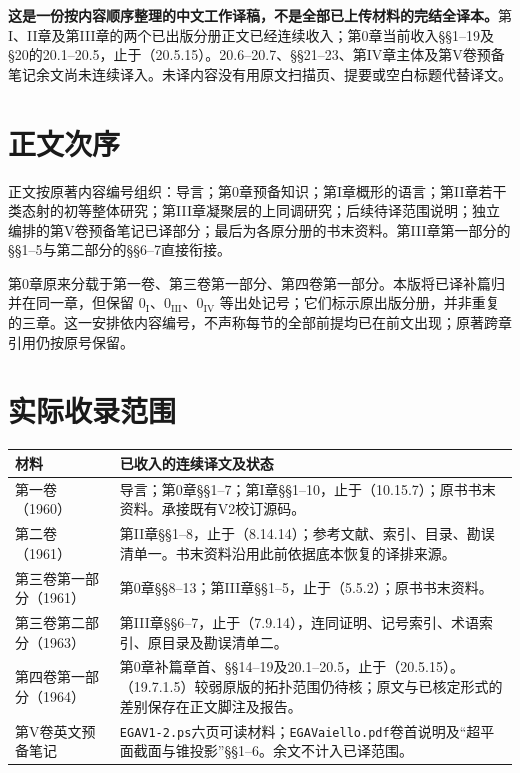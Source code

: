 \maketitle
{}
\noindent\textbf{这是一份按内容顺序整理的中文工作译稿，不是全部已上传材料的完结全译本。}第I、II章及第III章的两个已出版分册正文已经连续收入；第0章当前收入§§1--19及§20的20.1--20.5，止于（20.5.15）。20.6--20.7、§§21--23、第IV章主体及第V卷预备笔记余文尚未连续译入。未译内容没有用原文扫描页、提要或空白标题代替译文。

\section*{正文次序}
正文按原著内容编号组织：导言；第0章预备知识；第I章概形的语言；第II章若干类态射的初等整体研究；第III章凝聚层的上同调研究；后续待译范围说明；独立编排的第V卷预备笔记已译部分；最后为各原分册的书末资料。第III章第一部分的§§1--5与第二部分的§§6--7直接衔接。

第0章原来分载于第一卷、第三卷第一部分、第四卷第一部分。本版将已译补篇归并在同一章，但保留 $0_{\mathrm I}$、$0_{\mathrm{III}}$、$0_{\mathrm{IV}}$ 等出处记号；它们标示原出版分册，并非重复的三章。这一安排依内容编号，不声称每节的全部前提均已在前文出现；原著跨章引用仍按原号保留。

\section*{实际收录范围}
\begin{longtable}{@{}p{.25\linewidth}p{.67\linewidth}@{}}
\toprule 材料 & 已收入的连续译文及状态\\\midrule\endhead
第一卷（1960） & 导言；第0章§§1--7；第I章§§1--10，止于（10.15.7）；原书书末资料。承接既有V2校订源码。\\
第二卷（1961） & 第II章§§1--8，止于（8.14.14）；参考文献、索引、目录、勘误清单一。书末资料沿用此前依据底本恢复的译排来源。\\
第三卷第一部分（1961） & 第0章§§8--13；第III章§§1--5，止于（5.5.2）；原书书末资料。\\
第三卷第二部分（1963） & 第III章§§6--7，止于（7.9.14），连同证明、记号索引、术语索引、原目录及勘误清单二。\\
第四卷第一部分（1964） & 第0章补篇章首、§§14--19及20.1--20.5，止于（20.5.15）。（19.7.1.5）较弱原版的拓扑范围仍待核；原文与已核定形式的差别保存在正文脚注及报告。\\
第V卷英文预备笔记 & \texttt{EGAV1-2.ps}六页可读材料；\texttt{EGAVaiello.pdf}卷首说明及“超平面截面与锥投影”§§1--6。余文不计入已译范围。\\
\bottomrule
\end{longtable}

